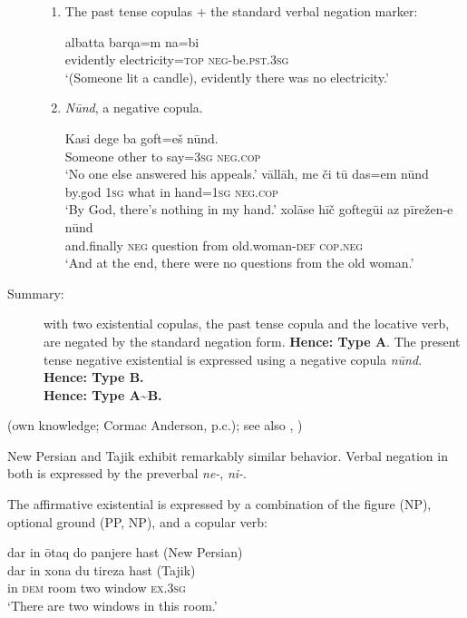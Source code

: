 \documentclass[output=paper,colorlinks,citecolor=brown]{langscibook}
\begin{document}
\begin{paperappendix}
\begin{unindented}
\begin{description}
\begin{enumerate}
\item The past tense copulas + the standard verbal negation marker:
\begin{exe}\ex
    \gll albatta      barqa=m          na=bi \\
evidently  electricity=\textsc{top} \textsc{neg}-be.\textsc{pst.3sg} \\
    \glt `(Someone lit a candle), evidently there was no electricity.' \citep[89]{Lecoq1979}
    \end{exe}
\item \textit{Nūnd}, a negative copula.
%
\begin{exe}\ex
    \gll Kasi dege  ba goft=eš    nūnd.           \\
Someone other to say=\textsc{3sg}  \textsc{neg}.\textsc{cop}  \\
    \glt `No one else answered his appeals.' \citep[95]{Lecoq1979}
\ex \gll vāllāh, me    či      tū  das=em      nūnd \\
by.god  \textsc{1sg}   what in hand=\textsc{1sg}    \textsc{neg.cop} \\
    \glt `By God, there's nothing in my hand.' \citep[150]{Lecoq1979}
\ex \gll xolāse hīč    goftegūi  az      pīrežen-e          nūnd \\
and.finally \textsc{neg}  question from  old.woman-\textsc{def}   \textsc{cop.neg} \\
    \glt `And at the end, there were no questions from the old woman.' \citep[108]{Lecoq1979}
    \end{exe}
\end{enumerate}

\item[Summary:] with two existential copulas, the past tense copula and
the locative verb, are negated by the standard negation form.
\textbf{Hence: Type A}. The present tense negative existential is expressed
using a negative copula \textit{nūnd}. \textbf{Hence: Type B.}\\
\textbf{Hence: Type A{\textasciitilde}B.}
\end{description}

(own knowledge; Cormac Anderson, p.c.); see also
\citealt{Perry2005}, \citealt{WindfuhrPerry2009})

New Persian and Tajik exhibit remarkably similar behavior. Verbal negation in both is expressed by the preverbal \textit{ne-}, \textit{ni-}. 

The affirmative existential is expressed by a combination of the figure (NP), optional ground (PP, NP), and a copular verb:
%
\let\eachwordtwo=\itshape
\begin{exe}\ex
    \glll dar in ōtaq   do   panjere  hast    \textup{(New Persian)} \\
dar in       xona  du   tireza     hast    \textup{(Tajik)} \\
in    \textsc{dem}  room  two window \textsc{ex.3sg}\\
    \glt `There are two windows in this room.' \parencite[450]{WindfuhrPerry2009}
    \end{exe}


\end{unindented}
\end{paperappendix}
\end{document}
